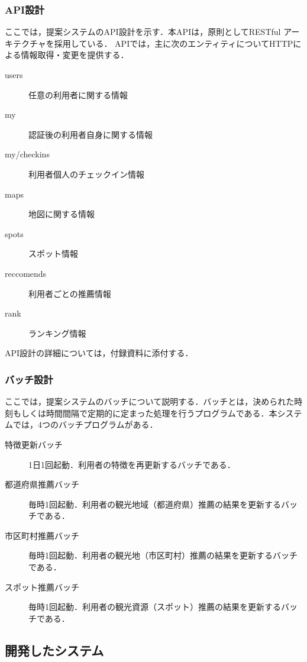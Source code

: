 \documentclass{jsarticle}
\begin{document}
\subsubsection{API設計}

ここでは，提案システムのAPI設計を示す．本APIは，原則としてRESTful アーキテクチャを採用している．
APIでは，主に次のエンティティについてHTTPによる情報取得・変更を提供する．

\begin{description}
    \item[users] 任意の利用者に関する情報
    \item[my] 認証後の利用者自身に関する情報
    \item[my/checkins] 利用者個人のチェックイン情報
    \item[maps] 地図に関する情報
    \item[spots] スポット情報
    \item[reccomends] 利用者ごとの推薦情報
    \item[rank] ランキング情報
\end{description}

API設計の詳細については，付録資料に添付する．

\subsubsection{バッチ設計}

ここでは，提案システムのバッチについて説明する．バッチとは，決められた時刻もしくは時間間隔で定期的に定まった処理を行うプログラムである．本システムでは，4つのバッチプログラムがある．

\begin{description}
    \item[特徴更新バッチ] 1日1回起動．利用者の特徴を再更新するバッチである．
    \item[都道府県推薦バッチ] 毎時1回起動．利用者の観光地域（都道府県）推薦の結果を更新するバッチである．
    \item[市区町村推薦バッチ] 毎時1回起動．利用者の観光地（市区町村）推薦の結果を更新するバッチである．
    \item[スポット推薦バッチ] 毎時1回起動．利用者の観光資源（スポット）推薦の結果を更新するバッチである．
\end{description}

\subsection{開発したシステム}
\end{document}
